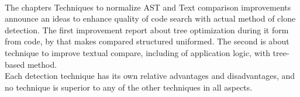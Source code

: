 \documentclass{report}
\begin{document}
\\
The chapters Techniques to normalize AST and Text comparison improvements announce an ideas to enhance quality of code search with actual method of clone detection. The first improvement report about tree optimization during it form from code, by that makes compared structured uniformed. The second is about technique to improve textual compare, including of application logic, with tree-based method.
\\
Each detection technique has its own relative advantages and disadvantages, and no technique is superior to any of the other techniques in all aspects.



\newpage
%
\end{document}
